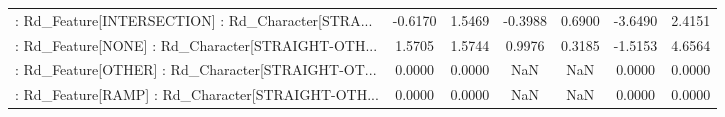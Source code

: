 \begin{longtable}{p{4cm}cccccc}
 : Rd\_Feature[INTERSECTION] : Rd\_Character[STRA... &           -0.6170 &            1.5469 & -0.3988 &       0.6900 &            -3.6490 &            2.4151 \\
 : Rd\_Feature[NONE] : Rd\_Character[STRAIGHT-OTH... &            1.5705 &            1.5744 &  0.9976 &       0.3185 &            -1.5153 &            4.6564 \\
 : Rd\_Feature[OTHER] : Rd\_Character[STRAIGHT-OT... &            0.0000 &            0.0000 &     NaN &          NaN &             0.0000 &            0.0000 \\
 : Rd\_Feature[RAMP] : Rd\_Character[STRAIGHT-OTH... &            0.0000 &            0.0000 &     NaN &          NaN &             0.0000 &            0.0000 \\
\end{longtable}
